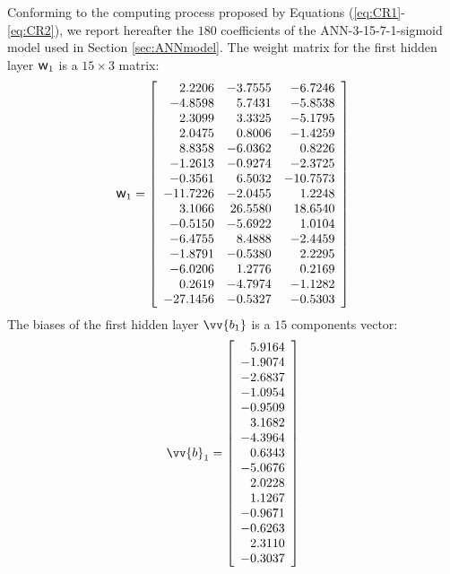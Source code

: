 \documentclass[twoside,english,1p,final,sort&compress]{elsarticle}
\theoremstyle{plain}
\DeclareRobustCommand{\w}{\mbox{\large\ensuremath{\mathsf{w}}}}
\renewcommand{\overrightarrow}{\vv}
\begin{document}
Conforming to the computing process proposed by Equations (\ref{eq:CR1}-\ref{eq:CR2}), we report hereafter the $180$ coefficients of the ANN-3-15-7-1-sigmoid model used in Section \ref{sec:ANNmodel}.
The weight matrix for the first hidden layer $\w_1$ is a $15\times3$ matrix:
\begin{equation*}
\w_1 = \left[
\begin{array}{rrr}
2.2206 & -3.7555 & -6.7246\\ 
-4.8598 & 5.7431 & -5.8538\\ 
2.3099 & 3.3325 & -5.1795\\ 
2.0475 & 0.8006 & -1.4259\\ 
8.8358 & -6.0362 & 0.8226\\ 
-1.2613 & -0.9274 & -2.3725\\ 
-0.3561 & 6.5032 & -10.7573\\ 
-11.7226 & -2.0455 & 1.2248\\ 
3.1066 & 26.5580 & 18.6540\\ 
-0.5150 & -5.6922 & 1.0104\\ 
-6.4755 & 8.4888 & -2.4459\\ 
-1.8791 & -0.5380 & 2.2295\\ 
-6.0206 & 1.2776 & 0.2169\\ 
0.2619 & -4.7974 & -1.1282\\ 
-27.1456 & -0.5327 & -0.5303\\ 
\end{array}\right]
\end{equation*}
The biases of the first hidden layer $\overrightarrow{b_1}$ is a $15$ components vector:
\begin{equation*}
\overrightarrow{b}_1 = \left[
\begin{array}{r}
5.9164\\ 
-1.9074\\ 
-2.6837\\ 
-1.0954\\ 
-0.9509\\ 
3.1682\\ 
-4.3964\\ 
0.6343\\ 
-5.0676\\ 
2.0228\\ 
1.1267\\ 
-0.9671\\ 
-0.6263\\ 
2.3110\\ 
-0.3037\\ 
\end{array}\right]
\end{equation*}
\end{document}
